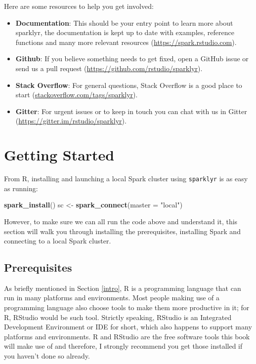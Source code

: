 \documentclass[]{book}
\newenvironment{Shaded}{\begin{snugshade}}{\end{snugshade}}
\newcommand{\KeywordTok}[1]{\textcolor[rgb]{0.13,0.29,0.53}{\textbf{#1}}}
\newcommand{\DataTypeTok}[1]{\textcolor[rgb]{0.13,0.29,0.53}{#1}}
\newcommand{\StringTok}[1]{\textcolor[rgb]{0.31,0.60,0.02}{#1}}
\newcommand{\NormalTok}[1]{#1}
\providecommand{\tightlist}{%
  \setlength{\itemsep}{0pt}\setlength{\parskip}{0pt}}
\theoremstyle{definition}
\theoremstyle{definition}
\theoremstyle{definition}
\theoremstyle{remark}
\begin{document}
Here are some resources to help you get involved:

\begin{itemize}
\tightlist
\item
  \textbf{Documentation}: This should be your entry point to learn more
  about sparklyr, the documentation is kept up to date with examples,
  reference functions and many more relevant resources
  (\url{https://spark.rstudio.com}).
\item
  \textbf{Github}: If you believe something needs to get fixed, open a
  GitHub issue or send us a pull request
  (\url{https://github.com/rstudio/sparklyr}).
\item
  \textbf{Stack Overflow}: For general questions, Stack Overflow is a
  good place to start (\url{stackoverflow.com/tags/sparklyr}).
\item
  \textbf{Gitter}: For urgent issues or to keep in touch you can chat
  with us in Gitter (\url{https://gitter.im/rstudio/sparklyr}).
\end{itemize}

\chapter{Getting Started}\label{started}

From R, installing and launching a local Spark cluster using
\texttt{sparklyr} is as easy as running:

\begin{Shaded}
\begin{Highlighting}[]
\KeywordTok{spark_install}\NormalTok{()}
\NormalTok{sc <-}\StringTok{ }\KeywordTok{spark_connect}\NormalTok{(}\DataTypeTok{master =} \StringTok{"local"}\NormalTok{)}
\end{Highlighting}
\end{Shaded}

However, to make sure we can all run the code above and understand it,
this section will walk you through installing the prerequisites,
installing Spark and connecting to a local Spark cluster.

\section{Prerequisites}\label{prerequisites}

As briefly mentioned in Section \ref{intro}, R is a programming language
that can run in many platforms and environments. Most people making use
of a programming language also choose tools to make them more productive
in it; for R, RStudio would be such tool. Strictly speaking, RStudio is
an Integrated Development Environment or IDE for short, which also
happens to support many platforms and environments. R and RStudio are
the free software tools this book will make use of and therefore, I
strongly recommend you get those installed if you haven't done so
already.
\end{document}
